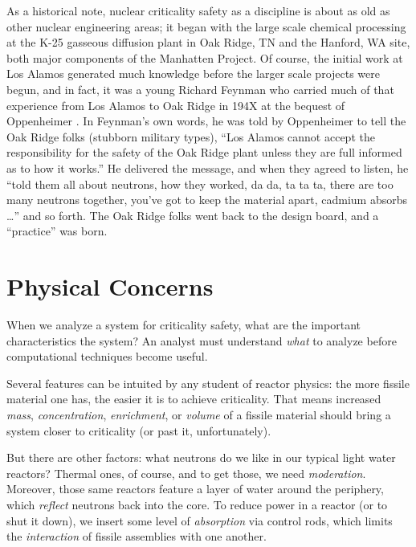 As a historical note, nuclear criticality safety as a discipline is 
about as old as other nuclear 
engineering areas; it began with the large scale chemical processing at
the K-25 gasseous diffusion plant in Oak Ridge, TN and the Hanford, WA site, 
both major components of the 
Manhatten Project.  Of course, the initial work at Los Alamos generated 
much knowledge before the larger scale projects were begun, and in fact, 
it was a young Richard Feynman who carried much of that experience from 
Los Alamos to Oak Ridge in 194X at the bequest of Oppenheimer 
\cite{something}. In Feynman's own words, he was told by Oppenheimer to
tell the Oak Ridge folks (stubborn military types), ``Los Alamos cannot 
accept the responsibility
for the safety of the Oak Ridge plant unless they are full informed as
to how it works.''  He delivered the message, and when they agreed to 
listen, he
``told them all about neutrons, how they worked, da da, ta ta ta,
there are too many neutrons together, you've got to keep the material
apart, cadmium absorbs \ldots'' and so forth.  The Oak Ridge folks
went back to the design board, and a ``practice'' was born.


\section*{Physical Concerns}

When we analyze a system for criticality safety, what are the important 
characteristics the system?  An analyst must understand \textit{what} to
analyze before computational techniques become useful.

Several features can be intuited by any
student of reactor physics: the more fissile material one has, the easier
it is to achieve criticality.  That means increased 
\textit{mass}, \textit{concentration}, \textit{enrichment}, or 
\textit{volume} of a fissile material should bring
a system closer to criticality (or past it, unfortunately).

But there are other factors: what neutrons do we like in our typical light
water reactors?  Thermal ones, of course, and to get those, we need 
\textit{moderation}.  Moreover, those same reactors feature a layer of
water around the periphery, which \textit{reflect} neutrons back into
the core.  To reduce power in a reactor (or to shut it down), we insert
some level of \textit{absorption} via control rods, which limits
the \textit{interaction} of fissile assemblies with one another. 

